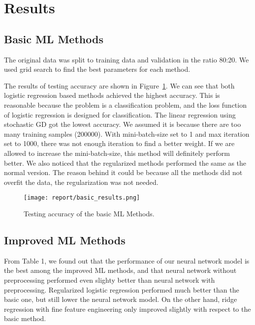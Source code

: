 \documentclass[10pt,conference,compsocconf]{IEEEtran}
\begin{document}
\section{Results}
\label{sec:experiments-results}

\subsection{Basic ML Methods}

The original data was split to training data and validation in the ratio 80:20. We used grid search to find the best parameters for each method.

The results of testing accuracy are shown in Figure~\ref{fig:basic-results}. We can see that both logistic regression based methods achieved the highest accuracy. This is reasonable because the problem is a classification problem, and the loss function of logistic regression is designed for classification. The linear regression using stochastic GD got the lowest accuracy. We assumed it is because there are too many training samples (200000). With mini-batch-size set to 1 and max iteration set to 1000, there was not enough iteration to find a better weight. If we are allowed to increase the mini-batch-size, this method will definitely perform better. We also noticed that the regularized methods performed the same as the normal version. The reason behind it could be because all the methods did not overfit the data, the regularization was not needed.

\begin{figure}[ht]
  \centering
  \texttt{[image: report/basic\_results.png]}
  \caption{Testing accuracy of the basic ML Methods.}
  \vspace{-3mm}
  \label{fig:basic-results}
\end{figure}

\subsection{Improved ML Methods}

From Table 1, we found out that the performance of our neural network model is the best among the improved ML methods, and that neural network without preprocessing performed even slighty better than neural network with preprocessing. Regularized logistic regression performed much better than the basic one, but still lower the neural network model. On the other hand, ridge regression with fine feature engineering only improved slightly with respect to the basic method.
\end{document}
